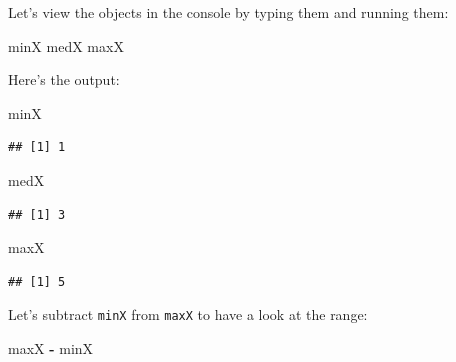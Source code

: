 \documentclass[
]{article}
\newenvironment{Shaded}{\begin{snugshade}}{\end{snugshade}}
\newcommand{\KeywordTok}[1]{\textcolor[rgb]{0.13,0.29,0.53}{\textbf{#1}}}
\newcommand{\NormalTok}[1]{#1}
\newcommand{\OperatorTok}[1]{\textcolor[rgb]{0.81,0.36,0.00}{\textbf{#1}}}
\newcommand{\StringTok}[1]{\textcolor[rgb]{0.31,0.60,0.02}{#1}}
\begin{document}
\begin{Shaded}
\end{Shaded}

Let's view the objects in the console by typing them and running them:

\begin{Shaded}
\begin{Highlighting}[]
\NormalTok{minX}
\NormalTok{medX}
\NormalTok{maxX}
\end{Highlighting}
\end{Shaded}

Here's the output:

\begin{Shaded}
\begin{Highlighting}[]
\NormalTok{minX}
\end{Highlighting}
\end{Shaded}

\begin{verbatim}
## [1] 1
\end{verbatim}

\begin{Shaded}
\begin{Highlighting}[]
\NormalTok{medX}
\end{Highlighting}
\end{Shaded}

\begin{verbatim}
## [1] 3
\end{verbatim}

\begin{Shaded}
\begin{Highlighting}[]
\NormalTok{maxX}
\end{Highlighting}
\end{Shaded}

\begin{verbatim}
## [1] 5
\end{verbatim}

Let's subtract \texttt{minX} from \texttt{maxX} to have a look at the range:

\begin{Shaded}
\begin{Highlighting}[]
\NormalTok{maxX }\OperatorTok{-}\StringTok{ }\NormalTok{minX}
\end{Highlighting}
\end{Shaded}
\end{document}
